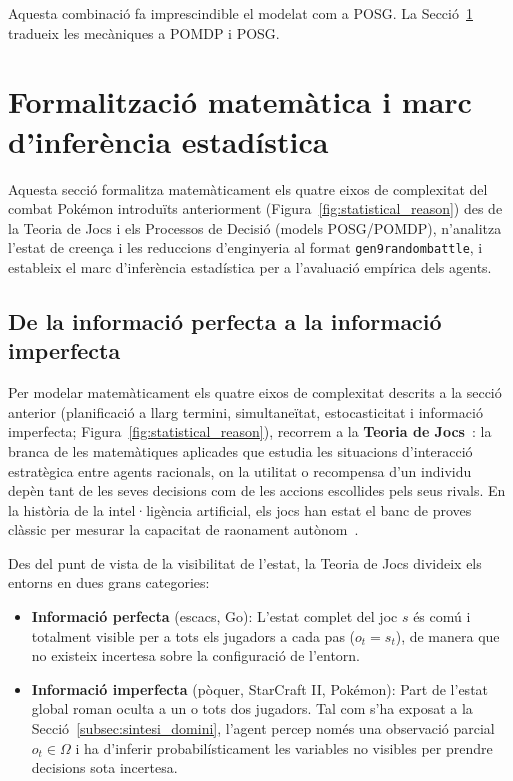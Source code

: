Aquesta combinació fa imprescindible el modelat com a POSG. La Secció~\ref{sec:ia_jocs} tradueix les mecàniques a POMDP i POSG.

\section{Formalització matemàtica i marc d'inferència estadística}
\label{sec:ia_jocs}

Aquesta secció formalitza matemàticament els quatre eixos de complexitat del combat Pokémon introduïts anteriorment (Figura~\ref{fig:statistical_reason}) des de la Teoria de Jocs i els Processos de Decisió (models POSG/POMDP), n'analitza l'estat de creença i les reduccions d'enginyeria al format \texttt{gen9randombattle}, i estableix el marc d'inferència estadística per a l'avaluació empírica dels agents.

\subsection{De la informació perfecta a la informació imperfecta}

Per modelar matemàticament els quatre eixos de complexitat descrits a la secció anterior (planificació a llarg termini, simultaneïtat, estocasticitat i informació imperfecta; Figura~\ref{fig:statistical_reason}), recorrem a la \textbf{Teoria de Jocs}~\cite{von_neumann}: la branca de les matemàtiques aplicades que estudia les situacions d'interacció estratègica entre agents racionals, on la utilitat o recompensa d'un individu depèn tant de les seves decisions com de les accions escollides pels seus rivals. En la història de la intel·ligència artificial, els jocs han estat el banc de proves clàssic per mesurar la capacitat de raonament autònom~\cite{shannon_chess,CAMPBELL200257,alphago,alphazero,alphastar,openai_five,libratus,pluribus}.

Des del punt de vista de la visibilitat de l'estat, la Teoria de Jocs divideix els entorns en dues grans categories:
\begin{itemize}
    \item \textbf{Informació perfecta} (escacs, Go): L'estat complet del joc $s$ és comú i totalment visible per a tots els jugadors a cada pas ($o_t = s_t$), de manera que no existeix incertesa sobre la configuració de l'entorn.
    \item \textbf{Informació imperfecta} (pòquer, StarCraft II, Pokémon): Part de l'estat global roman oculta a un o tots dos jugadors. Tal com s'ha exposat a la Secció~\ref{subsec:sintesi_domini}, l'agent percep només una observació parcial $o_t \in \Omega$ i ha d'inferir probabilísticament les variables no visibles per prendre decisions sota incertesa.
\end{itemize}

